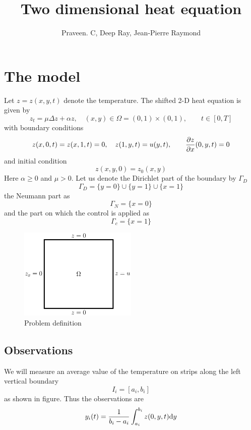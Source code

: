 \documentclass[12pt]{article}
\title{Two dimensional heat equation}
\author{Praveen. C, Deep Ray, Jean-Pierre Raymond}
\begin{document}
\maketitle


\section{The model}
Let $z = z(x,y,t)$ denote the temperature. 
The shifted 2-D heat equation is given by
\[
z_t = \mu \Delta z + \alpha z, \quad (x,y) \in \Omega = (0,1) \times (0,1), \qquad t \in  [0,T]
\]
with boundary conditions
\[
z(x,0,t) = z(x,1,t) = 0, \quad z(1,y,t) = u(y,t), \qquad \frac{\partial z}{\partial x}(0,y,t) = 0
\]
and initial condition
\[
z(x,y,0) = z_0(x,y)
\]
Here $\alpha \ge 0$ and $\mu > 0$. Let us denote the Dirichlet part of the boundary by $\Gamma_D$
\[
\Gamma_D = \{ y=0\} \cup \{ y=1\} \cup \{ x=1 \}
\]
the Neumann part as
\[
\Gamma_N = \{ x=0 \}
\]
and the part on which the control is applied as
\[
\Gamma_c = \{ x=1 \}
\]
\begin{figure}
\begin{center}
\includegraphics[width=0.5\textwidth]{heat2d_prob}
\caption{Problem definition}
\end{center}
\end{figure}

\subsection{Observations}
We will measure an average value of the temperature on strips along the left vertical boundary
\[
I_i = [a_i, b_i]
\]
as shown in figure. Thus the observations are
\begin{equation}
y_i(t) = \frac{1}{b_i - a_i} \int_{a_i}^{b_i} z(0,y,t) \textrm{d} y
\end{equation}
\end{document}

